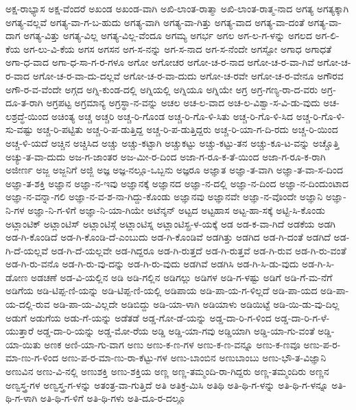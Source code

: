 {ಅಕ್ಷ-ರಾಭ್ಯಾಸ
ಅಕ್ಷ-ವೆಂದರೆ
ಅಖಂಡ
ಅಖಂಡ-ವಾಗಿ
ಅಖಿ-ಲಾಂತ-ರಾತ್ಮಾ
ಅಖಿ-ಲಾಂತ-ರಾತ್ಮ-ನಾದ
ಅಗತ್ಯ
ಅಗತ್ಯಕ್ಕಾಗಿ
ಅಗತ್ಯ-ವಲ್ಲವೆ
ಅಗತ್ಯ-ವಾ-ಗ-ಬ-ಹುದು
ಅಗತ್ಯ-ವಾಗಿ
ಅಗತ್ಯ-ವಾ-ಗಿತ್ತು
ಅಗತ್ಯ-ವಾದ
ಅಗತ್ಯ-ವಾ-ದಂತೆ
ಅಗತ್ಯ-ವಾ-ದಾಗ
ಅಗತ್ಯ-ವಿತ್ತು
ಅಗತ್ಯ-ವಿಲ್ಲ
ಅಗತ್ಯ-ವಿಲ್ಲ-ವೆಂದೂ
ಅಗಮ್ಯ
ಅಗರ್ಭ
ಅಗಲ
ಅಗ-ಲ-ಗ-ಳನ್ನು
ಅಗಲದ
ಅಗ-ಲಿ-ಕೆಯ
ಅಗ-ಲು-ವಿ-ಕೆಯ
ಅಗಸ
ಅಗಸನ
ಅಗ-ಸ-ನನ್ನು
ಅಗ-ಸ-ನಾದ
ಅಗ-ಸ-ನೆಂದೇ
ಅಗಸ್ಟೋ
ಅಗಾಧ
ಅಗಾಧತೆ
ಅಗಾ-ಧ-ವಾದ
ಅಗಾ-ಧ-ಸಾ-ಗ-ರ-ಗಳೂ
ಅಗೋ
ಅಗೋಚರ
ಅಗೋ-ಚ-ರ-ನಾದ
ಅಗೋ-ಚ-ರ-ವಾ-ಗಿವೆ
ಅಗೋ-ಚ-ರ-ವಾದ
ಅಗೋ-ಚ-ರ-ವಾ-ದು-ದಲ್ಲವೆ
ಅಗೋ-ಚ-ರ-ವಾ-ದುದು
ಅಗೋ-ಚ-ರವೇ
ಅಗೋ-ಚ-ರ-ವೇನೂ
ಅಗೌರವ
ಅಗೌ-ರ-ವ-ವೆಂದೇ
ಅಗ್ಗದ
ಅಗ್ನಿ-ಕುಂಡ-ದಲ್ಲಿ
ಅಗ್ನಿಯಲ್ಲಿ
ಅಗ್ನಿಯೂ
ಅಗ್ನಿಯೇ
ಅಗ್ರ
ಅಗ್ರ-ಗಣ್ಯ-ರಾ-ದ-ವರು
ಅಗ್ರ-ದೂ-ತ-ರಾಗಿ
ಅಗ್ರಪಟ್ಟ
ಅಗ್ರಮಾನ್ಯ
ಅಗ್ರಸ್ಥಾ-ನ-ವನ್ನು
ಅಚಲ
ಅಚ-ಲ-ವಾದ
ಅಚ-ಲ-ವಿಶ್ವಾ-ಸ-ವಿ-ಡು-ವುದು
ಅಚ-ಲಶ್ರದ್ಧೆ-ಯಿಂದ
ಅಚಿಂತ್ಯ
ಅಚ್ಚ
ಅಚ್ಚರಿ
ಅಚ್ಚ-ರಿ-ಗೊಂಡ
ಅಚ್ಚ-ರಿ-ಗೊ-ಳಿ-ಸಿತು
ಅಚ್ಚ-ರಿ-ಗೊ-ಳಿ-ಸಿದ
ಅಚ್ಚ-ರಿ-ಗೊ-ಳಿ-ಸು-ವಷ್ಟು
ಅಚ್ಚ-ರಿ-ಪಟ್ಟಿತು
ಅಚ್ಚ-ರಿ-ಪ-ಡುತ್ತಿದ್ದ
ಅಚ್ಚ-ರಿ-ಪ-ಡುತ್ತಿದ್ದರು
ಅಚ್ಚ-ರಿ-ಯಾ-ಗ-ದಿ-ರದು
ಅಚ್ಚ-ರಿ-ಯಿಂದ
ಅಚ್ಚ-ಳಿ-ಯದೆ
ಅಚ್ಚಿನ
ಅಚ್ಚಿಸಿದ
ಅಚ್ಚು
ಅಚ್ಚು-ಕಟ್ಟಾಗಿ
ಅಚ್ಚುಕಟ್ಟು
ಅಚ್ಚು-ಕಟ್ಟು-ತನ
ಅಚ್ಚು-ಕೂ-ಟ-ವನ್ನು
ಅಚ್ಚೊತ್ತಿ
ಅಚ್ಯು-ತ-ವಾ-ದುದು
ಅಜ-ಗ-ಜಾಂತರ
ಅಜ-ಮೀ-ರ-ದಿಂದ
ಅಜಾ-ಗ-ರೂ-ಕ-ತೆ-ಯಿಂದ
ಅಜಾ-ಗ-ರೂ-ಕ-ರಾಗಿ
ಅಜೀರ್ಣ
ಅಜ್ಜ
ಅಜ್ಜನಿಗೆ
ಅಜ್ಜಿ
ಅಜ್ಞ
ಅಜ್ಞ-ನಲ್ಲೂ-ಒಬ್ಬನು
ಅಜ್ಞರೂ
ಅಜ್ಞಾತ
ಅಜ್ಞಾ-ತ-ವಾಗಿ
ಅಜ್ಞಾ-ತ-ವಾ-ಸ-ದಿಂದ
ಅಜ್ಞಾ-ತ-ಶಕ್ತಿ
ಅಜ್ಞಾನ
ಅಜ್ಞಾ-ನ-ಇವು
ಅಜ್ಞಾನಕ್ಕೆ
ಅಜ್ಞಾನದ
ಅಜ್ಞಾ-ನ-ದಲ್ಲಿ
ಅಜ್ಞಾ-ನ-ದಿಂದ
ಅಜ್ಞಾ-ನ-ದಿಂದುಂಟಾದ
ಅಜ್ಞಾ-ನ-ವನ್ನಾ-ಗಲಿ
ಅಜ್ಞಾ-ನ-ವ-ಶ-ನಾ-ಗಿದ್ದು-ಕೊಂಡು
ಅಜ್ಞಾನವು
ಅಜ್ಞಾನವೇ
ಅಜ್ಞಾ-ನ-ವೊಂದೇ
ಅಜ್ಞಾನಿ
ಅಜ್ಞಾ-ನಿ-ಗಳ
ಅಜ್ಞಾ-ನಿ-ಗ-ಳಿಗೆ
ಅಜ್ಞಾ-ನಿ-ಯಾ-ಗಿಯೇ
ಅಟೆನ್ಶನ್
ಅಟ್ಟದ
ಅಟ್ಟಹಾಸ
ಅಟ್ಟ-ಹಾ-ಸಕ್ಕೆ
ಅಟ್ಟಿ-ಸಿ-ಕೊಂಡು
ಅಟ್ಲಾಂಟಿಕ್
ಅಟ್ಲಾಂಟಿಸ್
ಅಟ್ಲಾಂಟಿಸ್ಗೆ
ಅಟ್ಲಾಂಟಿಸ್ನ
ಅಟ್ಲಾಂಟಿಸ್ಪ್ರ-ಳ-ಯಕ್ಕೆ
ಅಡ
ಅಡ-ಕ-ವಾ-ಗಿದೆ
ಅಡಕೆಯ
ಅಡಗಿ
ಅಡ-ಗಿ-ಕೊಂಡಿದೆ
ಅಡ-ಗಿ-ಕೊಂಡಿ-ದೆ-ಎಂಬುದು
ಅಡ-ಗಿ-ಕೊಂಡಿವೆ
ಅಡಗಿತ್ತು
ಅಡಗಿದ
ಅಡ-ಗಿ-ದಂತೆ
ಅಡಗಿದೆ
ಅಡ-ಗಿ-ದೆ-ಯಲ್ಲವೆ
ಅಡ-ಗಿ-ದೆ-ಯಲ್ಲವೇ
ಅಡ-ಗಿದ್ದರೂ
ಅಡ-ಗಿ-ರುತ್ತದೆ
ಅಡ-ಗಿ-ರುತ್ತವೆ
ಅಡ-ಗಿ-ರುವ
ಅಡ-ಗಿ-ರು-ವಂತೆ
ಅಡ-ಗಿ-ರು-ವನೊ
ಅಡ-ಗಿ-ರು-ವು-ದನ್ನು
ಅಡ-ಗಿ-ರು-ವುದು
ಅಡಗಿವೆ
ಅಡಗಿಸಿ
ಅಡ-ಗಿ-ಸಿ-ಡು-ವುದು
ಅಡ-ಗಿ-ಸಿ-ಡೋಣ
ಅಡಚಣೆ
ಅಡ-ವಿ-ಯಲ್ಲಿನ
ಅಡಿ
ಅಡಿ-ಗಲ್ಲಿನ
ಅಡಿಗಲ್ಲು
ಅಡಿಗಳ
ಅಡಿ-ಗ-ಳಷ್ಟು
ಅಡಿಗೆ
ಅಡಿ-ಗೆ-ಮ-ನೆಗೆ
ಅಡಿಗೆಯ
ಅಡಿ-ಟಿಪ್ಪ-ಣಿ-ಯನ್ನು
ಅಡಿ-ಟಿಪ್ಪ-ಣಿ-ಯಲ್ಲಿ
ಅಡಿಪಾಯ
ಅಡಿ-ಪಾ-ಯ-ಗ-ಳಿಲ್ಲದೆ
ಅಡಿ-ಪಾ-ಯದ
ಅಡಿ-ಪಾ-ಯ-ದಲ್ಲಿ-ರುವ
ಅಡಿ-ಪಾ-ಯ-ವಿಲ್ಲದೇ
ಅಡಿಬಿದ್ದು
ಅಡಿ-ಯಾ-ಳಾಗಿ
ಅಡಿಯಾಳು
ಅಡಿಯಿಟ್ಟೆ
ಅಡಿ-ಯಿ-ಡು-ವು-ದಿಲ್ಲ
ಅಡುಗೆ
ಅಡುಗೆಯ
ಅಡು-ಗೆ-ಯನ್ನು
ಅಡೆತಡೆ
ಅಡ್ಡ-ಗೋ-ಡೆ-ಯನ್ನು
ಅಡ್ಡ-ದಾ-ರಿ-ಗ-ಳಿಂದ
ಅಡ್ಡ-ದಾ-ರಿ-ಗ-ಳೆ-ಯುತ್ತಾರೆ
ಅಡ್ಡ-ದಾ-ರಿ-ಯನ್ನು
ಅಡ್ಡ-ಮೋ-ರೆಯ
ಅಡ್ಡಿ
ಅಡ್ಡಿ-ಯಾ-ಗವು
ಅಡ್ಡಿಯಾಗಿ
ಅಡ್ಡಿ-ಯಾ-ಗು-ವಂತೆ
ಅಡ್ಡಿ-ಯಾ-ಯಿತು
ಅಣಕ
ಅಣಿ-ಯಾ-ಗು-ವಾಗ
ಅಣು
ಅಣು-ಕ-ಣ-ಗಳ
ಅಣು-ಕ-ಣ-ವನ್ನೂ
ಅಣು-ಕ-ಣವೂ
ಅಣು-ಪ-ರ-ಮಾ-ಣು-ಗ-ಳಿಂದ
ಅಣು-ಪ-ರ-ಮಾ-ಣು-ರಾ-ಕೆಟ್ಟು-ಗಳ
ಅಣು-ಬಾಂಬಿನ
ಅಣುಬಾಂಬು
ಅಣು-ಭೌ-ತ-ವಿಜ್ಞಾನಿ
ಅಣುವಿನ
ಅಣು-ವಿ-ನಲ್ಲಿ
ಅಣುಶಕ್ತಿ
ಅಣು-ಶಕ್ತಿಯ
ಅಣ್ಣ
ಅಣ್ಣ-ತಮ್ಮಂದಿ-ರಾ-ಗಿದ್ದರು
ಅಣ್ಣ-ತಮ್ಮಂದಿರು
ಅಣ್ಣನ
ಅಣ್ವಸ್ತ್ರ-ಗಳ
ಅಣ್ವಸ್ತ್ರ-ಗ-ಳನ್ನು
ಅತಂತ್ರ-ವಾ-ಗುತ್ತಿದೆ
ಅತಿ
ಅತಿಕ್ರ-ಮಿಸಿ
ಅತಿಥಿ
ಅತಿ-ಥಿ-ಗ-ಳನ್ನು
ಅತಿ-ಥಿ-ಗ-ಳನ್ನೂ
ಅತಿ-ಥಿ-ಗ-ಳಾಗಿ
ಅತಿ-ಥಿ-ಗ-ಳಿಗೆ
ಅತಿ-ಥಿ-ಗಳು
ಅತಿ-ದೂ-ರ-ದಲ್ಲೂ
}
